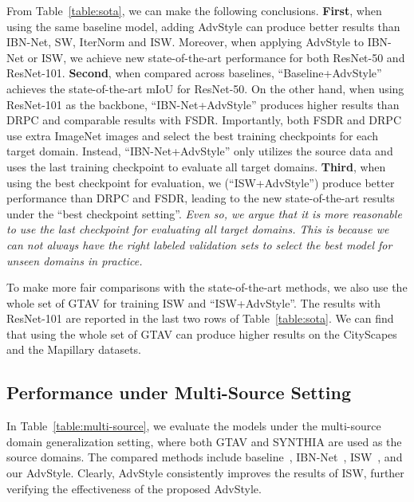 \documentclass{article}
\newcommand{\ours}{AdvStyle\xspace}
\begin{document}
From Table~\ref{table:sota}, we can make the following conclusions. \textbf{First}, when using the same baseline model, adding \ours can produce better results than IBN-Net, SW, IterNorm and ISW. Moreover, when applying \ours to IBN-Net or ISW, we achieve new state-of-the-art performance for both ResNet-50 and ResNet-101. 
\textbf{Second}, when compared across baselines, ``Baseline+\ours'' achieves the state-of-the-art mIoU for ResNet-50. On the other hand, when using ResNet-101 as the backbone, ``IBN-Net+\ours'' produces higher results than DRPC and comparable results with FSDR. Importantly, both FSDR and DRPC use extra ImageNet images and select the best training checkpoints for each target domain. Instead, ``IBN-Net+\ours'' only utilizes the source data and uses the last training checkpoint to evaluate all target domains. 
\textbf{Third}, when using the best checkpoint for evaluation, we (``ISW+\ours'') produce better performance than DRPC and FSDR, leading to the new state-of-the-art results under the ``best checkpoint setting''. \textit{Even so, we argue that it is more reasonable to use the last checkpoint for evaluating all target domains. This is because we can not always have the right labeled validation sets to select the best model for unseen domains in practice.}

{To make more fair comparisons with the state-of-the-art methods, we also use the whole set of GTAV for training ISW and ``ISW+AdvStyle''. The results with ResNet-101 are reported in the last two rows of Table~\ref{table:sota}. We can find that using the whole set of GTAV can produce higher results on the CityScapes and the Mapillary datasets.}



\subsection{Performance under Multi-Source Setting}

{In Table~\ref{table:multi-source}, we evaluate the models under the multi-source domain generalization setting, where both GTAV and SYNTHIA are used as the source domains. The compared methods include baseline~\cite{robustnet}, IBN-Net~\cite{ibn}, ISW~\cite{robustnet}, and our \ours. Clearly, AdvStyle consistently improves the results of ISW, further verifying the effectiveness of the proposed AdvStyle.}
\end{document}
